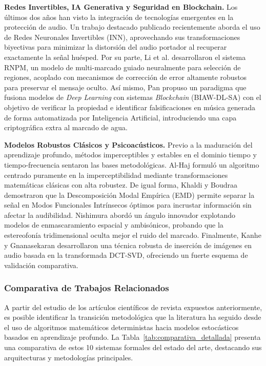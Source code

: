 \textbf{Redes Invertibles, IA Generativa y Seguridad en Blockchain.} Los últimos dos años han visto la integración de tecnologías emergentes en la protección de audio. Un trabajo destacado publicado recientemente \cite{AJCIS_2025} aborda el uso de Redes Neuronales Invertibles (INN), aprovechando sus transformaciones biyectivas para minimizar la distorsión del audio portador al recuperar exactamente la señal huésped. Por su parte, Li et al. \cite{Li_2025} desarrollaron el sistema RNPM, un modelo de multi-marcado guiado neuralmente para selección de regiones, acoplado con mecanismos de corrección de error altamente robustos para preservar el mensaje oculto. Así mismo, Pan \cite{Pan_2026} propuso un paradigma que fusiona modelos de \textit{Deep Learning} con sistemas \textit{Blockchain} (BIAW-DL-SA) con el objetivo de verificar la propiedad e identificar falsificaciones en música generada de forma automatizada por Inteligencia Artificial, introduciendo una capa criptográfica extra al marcado de agua.

\textbf{Modelos Robustos Clásicos y Psicoacústicos.} Previo a la maduración del aprendizaje profundo, métodos imperceptibles y estables en el dominio tiempo y tiempo-frecuencia sentaron las bases metodológicas. Al-Haj \cite{Al_Haj_2014} formuló un algoritmo centrado puramente en la imperceptibilidad mediante transformaciones matemáticas clásicas con alta robustez. De igual forma, Khaldi y Boudraa \cite{Khaldi_2013} demostraron que la Descomposición Modal Empírica (EMD) permite separar la señal en Modos Funcionales Intrínsecos óptimos para incrustar información sin afectar la audibilidad. Nishimura \cite{Nishimura_2012} abordó un ángulo innovador explotando modelos de enmascaramiento espacial y ambisónicos, probando que la estereofonía tridimensional oculta mejor el ruido del marcado. Finalmente, Kanhe y Gnanasekaran \cite{Kanhe_2018} desarrollaron una técnica robusta de inserción de imágenes en audio basada en la transformada DCT-SVD, ofreciendo un fuerte esquema de validación comparativa.

\subsubsection{Comparativa de Trabajos Relacionados}
\label{subsec:comparativa_trabajos}

A partir del estudio de los artículos científicos de revista expuestos anteriormente, es posible identificar la transición metodológica que la literatura ha seguido desde el uso de algoritmos matemáticos deterministas hacia modelos estocásticos basados en aprendizaje profundo. La Tabla~\ref{tab:comparativa_detallada} presenta una comparativa de estos 10 sistemas formales del estado del arte, destacando sus arquitecturas y metodologías principales.

